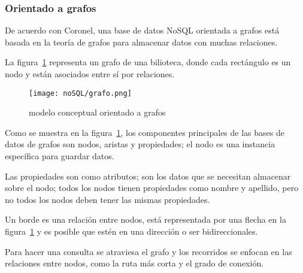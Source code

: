 \subsubsection{Orientado a grafos}
De acuerdo con Coronel\cite{coronel_database_nodate}, una base de datos NoSQL orientada a grafos está basada en la teoría de grafos para almacenar datos con muchas relaciones.



La figura~\ref{img:nosql-grafo} representa un grafo de una bilioteca, donde cada rectángulo es un nodo y están asociados entre sí por relaciones.
\begin{figure}[H] 
    \centering
    \texttt{[image: noSQL/grafo.png]}
    \caption{modelo conceptual orientado a grafos}
    \label{img:nosql-grafo}
\end{figure}


Como se muestra en la figura~\ref{img:nosql-grafo}, los componentes principales de las bases de datos de grafos son nodos, aristas y propiedades; el nodo es una instancia específica para guardar datos.


Las propiedades son como atributos; son los datos que se necesitan almacenar sobre el nodo; todos los nodos tienen propiedades como nombre y apellido, pero no todos los nodos deben tener las mismas propiedades.


Un borde es una relación entre nodos, está representada por una flecha en la figura~\ref{img:nosql-grafo} y es posible que estén en una dirección o ser bidireccionales.


Para hacer una consulta se atraviesa el grafo y los recorridos se enfocan en las relaciones entre nodos, como la ruta más corta y el grado de conexión.

